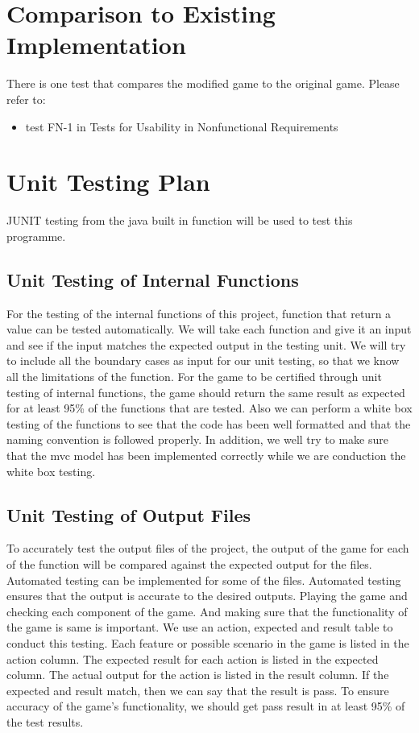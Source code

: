 \documentclass[12pt,letterpaper]{article}
\begin{document}
	\section{Comparison to Existing Implementation}
	 There is one test that compares the modified game to the original game. Please refer to:
	\begin{itemize}
	\item test FN-1 in Tests for Usability in Nonfunctional Requirements
	\end{itemize}

	\section{Unit Testing Plan}
	JUNIT testing from the java built in function will be used to test this programme.
	\subsection{Unit Testing of Internal Functions}
	 For the testing of the internal functions of this project, function that return a value can be tested automatically. We will take each function and give it an input and see if the input matches the expected output in the testing unit. We will try to include all the boundary cases as input for our unit testing, so that we know all the limitations of the function. For the game to be certified through unit testing of internal functions, the game should return the same result as expected for at least 95\% of the functions that are tested. Also we can perform a white box testing of the functions to see that the code has been well formatted and that the naming convention is followed properly. In addition, we well try to make sure that the mvc model has been implemented correctly while we are conduction the white box testing.
	\subsection{Unit Testing of Output Files}
	To accurately test the output files of the project, the output of the game for each of the function will be compared against the expected output for the files. Automated testing can be implemented for some of the files. Automated testing ensures that the output is accurate to the desired outputs. Playing the game and checking each component of the game. And making sure that the functionality of the game is same is important. We use an action, expected and result table to conduct this testing. Each feature or possible scenario in the game is listed in the action column. The expected result for each action is listed in the expected column. The actual output for the action is listed in the result column. If the expected and result match, then we can say that the result is pass. To ensure accuracy of the game’s functionality, we should get pass result in at least 95\% of the test results.
\end{document}
